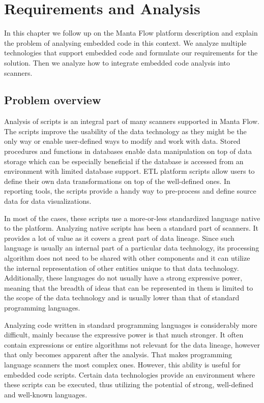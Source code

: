\chapter{Requirements and Analysis}

In this chapter we follow up on the Manta Flow platform description and explain the problem of analysing embedded code in this context. We analyze multiple technologies that support embedded code and formulate our requirements for the solution. Then we analyze how to integrate embedded code analysis into scanners.

\section{Problem overview}
Analysis of scripts is an integral part of many scanners supported in Manta Flow. The scripts improve the usability of the data technology as they might be the only way or enable user-defined ways to modify and work with data. Stored procedures and functions in databases enable data manipulation on top of data storage which can be especially beneficial if the database is accessed from an environment with limited database support. ETL platform scripts allow users to define their own data transformations on top of the well-defined ones. In reporting tools, the scripts provide a handy way to pre-process and define source data for data visualizations.
\par %
In most of the cases, these scripts use a more-or-less standardized language native to the platform. Analyzing native scripts has been a standard part of scanners. It provides a lot of value as it covers a great part of data lineage. Since such language is usually an internal part of a particular data technology, its processing algorithm does not need to be shared with other components and it can utilize the internal representation of other entities unique to that data technology. Additionally, these languages do not usually have a strong expressive power, meaning that the breadth of ideas that can be represented in them is limited to the scope of the data technology and is usually  lower than that of standard programming languages.
\par %
Analyzing code written in standard programming languages is considerably more difficult, mainly because the expressive power is that much stronger. It often contain expressions or entire algorithms not relevant for the data lineage, however that only becomes apparent after the analysis. That makes programming language scanners the most complex ones. However, this ability is useful for embedded code scripts. Certain data technologies provide an environment where these scripts can be executed, thus utilizing the potential of strong, well-defined and well-known languages.

